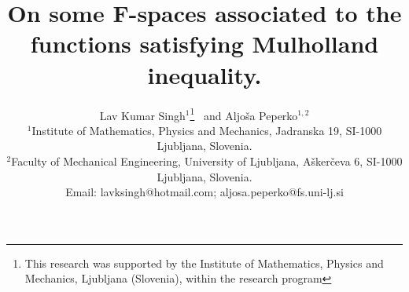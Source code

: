 \documentclass[pdflatex,sn-mathphys-num]{sn-jnl}%
\theoremstyle{thmstyleone}%
\theoremstyle{thmstyletwo}%
\theoremstyle{thmstylethree}%
\begin{document}
\title[Article Title]{On some F-spaces associated to the functions  satisfying Mulholland inequality.}

\author{\begin{center}Lav Kumar Singh${}^1$\footnote{This research was supported by the Institute of Mathematics, Physics and Mechanics, Ljubljana (Slovenia), within the research program } ~and Aljo\v{s}a Peperko${}^{1,2}$\\
	${}^1$Institute of Mathematics, Physics and Mechanics,
	Jadranska 19, SI-1000 Ljubljana, Slovenia.\\${}^2$Faculty of Mechanical Engineering,
	University of Ljubljana, A\v{s}ker\v{c}eva 6, SI-1000 Ljubljana, Slovenia. \\
	Email: lavksingh@hotmail.com; aljosa.peperko@fs.uni-lj.si\end{center}}




\end{document}
